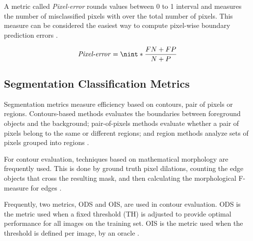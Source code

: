 A metric called \textit{Pixel-error} rounds values between 0 to 1 interval and measures the number of misclassified pixels with over the total number of pixels. 
This measure can be considered the easiest way to compute pixel-wise boundary prediction errors \cite{Unet:2015} \cite{ISBI:2012} \cite{ArgandaCarreras:2015}.

\begin{equation}
  \text{\textit{Pixel-error}} = \nint*{\frac{FN + FP}{N + P}}
  \label{equ:cap3_pixel_error}
\end{equation}

\subsection{Segmentation Classification Metrics}
\label{cap3_metricas_segmentacao}

Segmentation metrics measure efficiency based on contours, pair of pixels or regions.
Contours-based methods evaluates the boundaries between foreground objects and the background; 
pair-of-pixels methods evaluate whether a pair of pixels belong to the same or different regions;
and region methods analyze sets of pixels grouped into regions \cite{Pont-Tuset2016a}.

For contour evaluation, techniques based on mathematical morphology are frequently used.
This is done by ground truth pixel dilations, counting the edge objects that cross the resulting mask, and then calculating the morphological F-measure for edges \cite{Pont-Tuset2016a}.

Frequently, two metrics, \ac{ODS} and \ac{OIS}, are used in contour evaluation.
\ac{ODS} is the metric used when a fixed threshold (\ac{TH}) is adjusted to provide optimal performance for all images on the training set.
\ac{OIS} is the metric used when the threshold is defined per image, by an oracle \cite{amfm_pami2011}.


